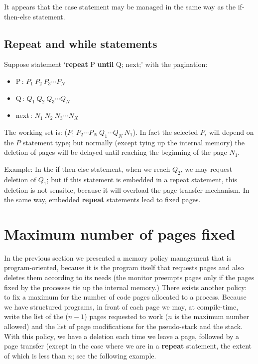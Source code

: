 \documentclass[openany,nobib]{tufte-book}
\newcommand{\kw}[1]{{\bf #1}}
\begin{document}
It appears that the case statement may be managed in the same way as the
if-then-else statement.

\subsection{Repeat and while statements}

Suppose statement `\kw{repeat} P \kw{until} Q; next;' with the pagination:
\begin{itemize}
    \item[] P\,: $P_1\ P_2\ P_3\cdots P_N$
    \item[] Q\,: $Q_1\ Q_2\ Q_3\cdots Q_N$
    \item[] next\,: $N_1\ N_2\ N_3\cdots N_X$
\end{itemize}
The working set is: ($P_1\ P_2\cdots P_N\ Q_1\cdots Q_N\ N_1$). In fact the
selected $P_i$ will depend on the $P$ statement type; but normally (except
tying up the internal memory) the deletion of pages will be delayed until
reaching the beginning of the page $N_1$.

Example: In the if-then-else statement, when we reach $Q_2$, we may request
deletion of $Q_1$; but if this statement is embedded in a repeat statement,
this deletion is not sensible, because it will overload the page transfer
mechanism. In the same way, embedded \kw{repeat} statements lead to fixed
pages.

\section{Maximum number of pages fixed}

In the previous section we presented a memory policy management that is
program-oriented, because it is the program itself that requests pages and also
deletes them according to its needs (the monitor preempts pages only if the
pages fixed by the processes tie up the internal memory.) There exists another
policy: to fix a maximum for the number of code pages allocated to a process.
Because we have structured programs, in front of each page we may, at
compile-time, write the list of the ($n-1$) pages requested to work ($n$ is the
maximum number allowed) and the list of page modifications for the pseudo-stack
and the stack. With this policy, we have a deletion each time we leave a page,
followed by a page transfer (except in the case where we are in a \kw{repeat}
statement, the extent of which is less than $n$; see the following example.
\end{document}
